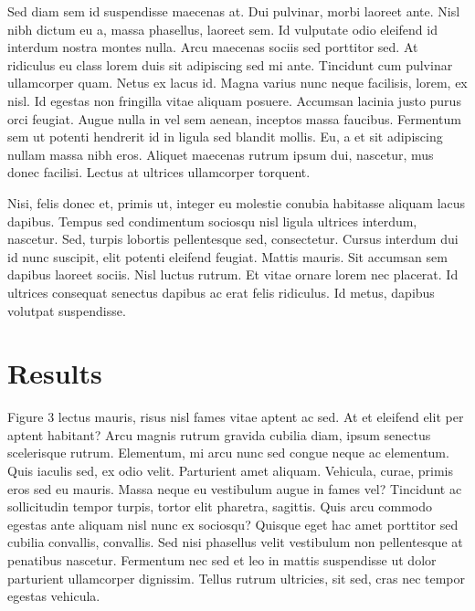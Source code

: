 \documentclass[
  12,
]{article}
\begin{document}
Sed diam sem id suspendisse maecenas at. Dui pulvinar, morbi laoreet
ante. Nisl nibh dictum eu a, massa phasellus, laoreet sem. Id vulputate
odio eleifend id interdum nostra montes nulla. Arcu maecenas sociis sed
porttitor sed. At ridiculus eu class lorem duis sit adipiscing sed mi
ante. Tincidunt cum pulvinar ullamcorper quam. Netus ex lacus id. Magna
varius nunc neque facilisis, lorem, ex nisl. Id egestas non fringilla
vitae aliquam posuere. Accumsan lacinia justo purus orci feugiat. Augue
nulla in vel sem aenean, inceptos massa faucibus. Fermentum sem ut
potenti hendrerit id in ligula sed blandit mollis. Eu, a et sit
adipiscing nullam massa nibh eros. Aliquet maecenas rutrum ipsum dui,
nascetur, mus donec facilisi. Lectus at ultrices ullamcorper torquent.

Nisi, felis donec et, primis ut, integer eu molestie conubia habitasse
aliquam lacus dapibus. Tempus sed condimentum sociosqu nisl ligula
ultrices interdum, nascetur. Sed, turpis lobortis pellentesque sed,
consectetur. Cursus interdum dui id nunc suscipit, elit potenti eleifend
feugiat. Mattis mauris. Sit accumsan sem dapibus laoreet sociis. Nisl
luctus rutrum. Et vitae ornare lorem nec placerat. Id ultrices consequat
senectus dapibus ac erat felis ridiculus. Id metus, dapibus volutpat
suspendisse.

\hypertarget{results}{%
\section{Results}\label{results}}

Figure 3 lectus mauris, risus nisl fames vitae aptent ac sed. At et
eleifend elit per aptent habitant? Arcu magnis rutrum gravida cubilia
diam, ipsum senectus scelerisque rutrum. Elementum, mi arcu nunc sed
congue neque ac elementum. Quis iaculis sed, ex odio velit. Parturient
amet aliquam. Vehicula, curae, primis eros sed eu mauris. Massa neque eu
vestibulum augue in fames vel? Tincidunt ac sollicitudin tempor turpis,
tortor elit pharetra, sagittis. Quis arcu commodo egestas ante aliquam
nisl nunc ex sociosqu? Quisque eget hac amet porttitor sed cubilia
convallis, convallis. Sed nisi phasellus velit vestibulum non
pellentesque at penatibus nascetur. Fermentum nec sed et leo in mattis
suspendisse ut dolor parturient ullamcorper dignissim. Tellus rutrum
ultricies, sit sed, cras nec tempor egestas vehicula.
\end{document}
